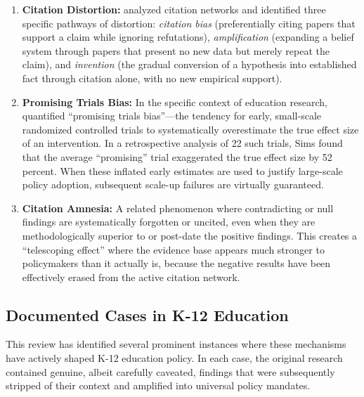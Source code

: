 \documentclass[12pt,letterpaper]{article}
\begin{document}
\begin{enumerate}
    \item \textbf{Citation Distortion:} \citet{greenberg2009} analyzed citation networks and identified three specific pathways of distortion: \textit{citation bias} (preferentially citing papers that support a claim while ignoring refutations), \textit{amplification} (expanding a belief system through papers that present no new data but merely repeat the claim), and \textit{invention} (the gradual conversion of a hypothesis into established fact through citation alone, with no new empirical support).
    
    \item \textbf{Promising Trials Bias:} In the specific context of education research, \citet{sims2023} quantified ``promising trials bias''---the tendency for early, small-scale randomized controlled trials to systematically overestimate the true effect size of an intervention. In a retrospective analysis of 22 such trials, Sims found that the average ``promising'' trial exaggerated the true effect size by 52 percent. When these inflated early estimates are used to justify large-scale policy adoption, subsequent scale-up failures are virtually guaranteed.
    
    \item \textbf{Citation Amnesia:} A related phenomenon where contradicting or null findings are systematically forgotten or uncited, even when they are methodologically superior to or post-date the positive findings. This creates a ``telescoping effect'' where the evidence base appears much stronger to policymakers than it actually is, because the negative results have been effectively erased from the active citation network.
\end{enumerate}

\subsection{Documented Cases in K-12 Education}

This review has identified several prominent instances where these mechanisms have actively shaped K-12 education policy. In each case, the original research contained genuine, albeit carefully caveated, findings that were subsequently stripped of their context and amplified into universal policy mandates.
\end{document}
